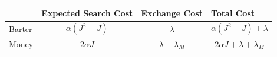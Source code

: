 \begin{tabular}{lccc}
\toprule
 & \multicolumn{1}{l}{Expected Search Cost} & \multicolumn{1}{l}{Exchange Cost} & \multicolumn{1}{l}{Total Cost} \\
\midrule
Barter & $\alpha(J^2 - J)$ & $\lambda$ & $\alpha(J^2 - J) + \lambda$ \\
Money  & $2\alpha J$ & $\lambda + \lambda_M$ & $2\alpha J + \lambda + \lambda_M$ \\
\bottomrule
\end{tabular}
